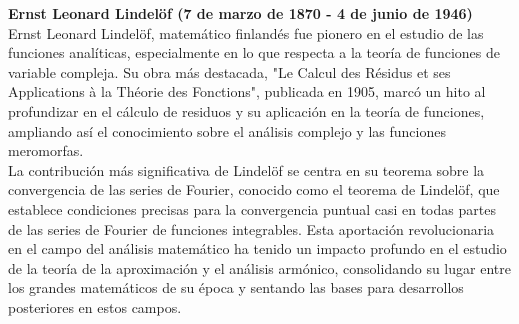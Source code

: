\begin{mdframed}[style=warning]
	\begin{tcolorbox}[arc=0mm,boxrule=0pt,colframe=white,colback=lightgray!25]
		{\large \textbf{Ernst Leonard Lindelöf (7 de marzo de 1870 - 4 de junio de 1946)}} \\
		Ernst Leonard Lindelöf, matemático finlandés fue pionero en el estudio de las funciones analíticas, especialmente en lo que respecta a la teoría de funciones de variable compleja. Su obra más destacada, "Le Calcul des Résidus et ses Applications à la Théorie des Fonctions", publicada en 1905, marcó un hito al profundizar en el cálculo de residuos y su aplicación en la teoría de funciones, ampliando así el conocimiento sobre el análisis complejo y las funciones meromorfas. \\

		La contribución más significativa de Lindelöf se centra en su teorema sobre la convergencia de las series de Fourier, conocido como el teorema de Lindelöf, que establece condiciones precisas para la convergencia puntual casi en todas partes de las series de Fourier de funciones integrables. Esta aportación revolucionaria en el campo del análisis matemático ha tenido un impacto profundo en el estudio de la teoría de la aproximación y el análisis armónico, consolidando su lugar entre los grandes matemáticos de su época y sentando las bases para desarrollos posteriores en estos campos.
	\end{tcolorbox}
\end{mdframed}




